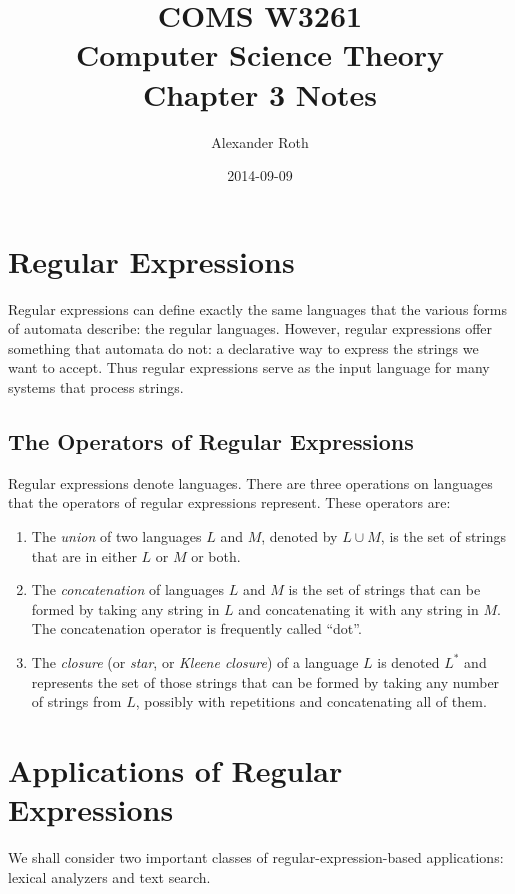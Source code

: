 \documentclass[]{article}
\begin{document}
\title{COMS W3261 \\ Computer Science Theory \\ Chapter 3 Notes}
\author{Alexander Roth}
\date{2014-09-09}
\maketitle

\section*{Regular Expressions}
  Regular expressions can define exactly the same languages that the various
  forms of automata describe: the regular languages. However, regular
  expressions offer something that automata do not: a declarative way to express
  the strings we want to accept. Thus regular expressions serve as the input
  language for many systems that process strings.

  \subsection*{The Operators of Regular Expressions}
    Regular expressions denote languages. There are three operations on
    languages that the operators of regular expressions represent. These
    operators are:
    \begin{enumerate}
      \item The \emph{union} of two languages $L$ and $M$, denoted by
      $L \cup M$, is the set of strings that are in either $L$ or $M$ or both.
      \item The \emph{concatenation} of languages $L$ and $M$ is the set of
      strings that can be formed by taking any string in $L$ and concatenating
      it with any string in $M$. The concatenation operator is frequently called
      ``dot''.
      \item The \emph{closure} (or \emph{star}, or \emph{Kleene closure}) of a
      language $L$ is denoted $L^*$ and represents the set of those strings that
      can be formed by taking any number of strings from $L$, possibly with
      repetitions and concatenating all of them.
    \end{enumerate}

\section*{Applications of Regular Expressions}
  We shall consider two important classes of regular-expression-based
  applications: lexical analyzers and text search.
\end{document}
